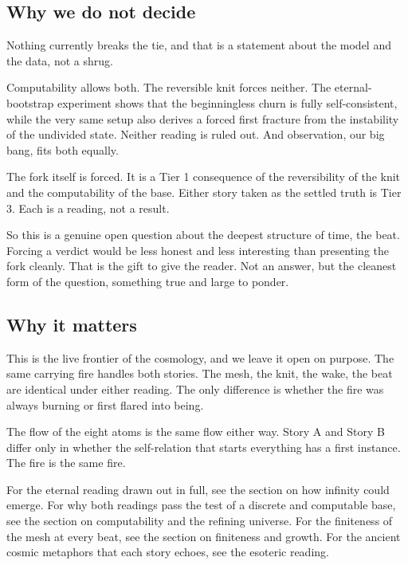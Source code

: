 \subsection{Why we do not decide}

Nothing currently breaks the tie, and that is a statement about the model and the data, not a shrug.

Computability allows both. The reversible knit forces neither. The eternal-bootstrap experiment shows that the beginningless churn is fully self-consistent, while the very same setup also derives a forced first fracture from the instability of the undivided state. Neither reading is ruled out. And observation, our big bang, fits both equally.

\begin{principle}
The fork itself is forced. It is a Tier 1 consequence of the reversibility of the knit and the computability of the base. Either story taken as the settled truth is Tier 3. Each is a reading, not a result.
\end{principle}

So this is a genuine open question about the deepest structure of time, the beat. Forcing a verdict would be less honest and less interesting than presenting the fork cleanly. That is the gift to give the reader. Not an answer, but the cleanest form of the question, something true and large to ponder.

\subsection{Why it matters}

This is the live frontier of the cosmology, and we leave it open on purpose. The same carrying fire handles both stories. The mesh, the knit, the wake, the beat are identical under either reading. The only difference is whether the fire was always burning or first flared into being.

\begin{result}
The flow of the eight atoms is the same flow either way. Story A and Story B differ only in whether the self-relation that starts everything has a first instance. The fire is the same fire.
\end{result}

For the eternal reading drawn out in full, see the section on how infinity could emerge. For why both readings pass the test of a discrete and computable base, see the section on computability and the refining universe. For the finiteness of the mesh at every beat, see the section on finiteness and growth. For the ancient cosmic metaphors that each story echoes, see the esoteric reading.
